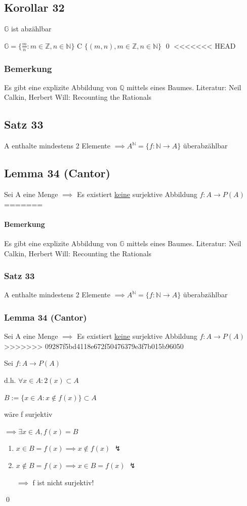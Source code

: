 \documentclass[fleqn]{scrbook}
\newcommand{\qq}[1]{\glqq #1\grqq}
\newcommand{\N}{\mathbb{N}}
\renewenvironment{proof}{{\bfseries Beweis }}{\qed}
\begin{document}
\subsection{Korollar 32}

$\mathbb{G}$ ist abzählbar

\begin{proof}
$\mathbb{G} = \{ \frac{m}{n}: m \in \mathbb{Z}, n \in \N\}$ \qq C $\{(m,n), m \in \mathbb{Z}, n \in \N\}$
\end{proof}
<<<<<<< HEAD
\subsubsection{Bemerkung} Es gibt eine explizite Abbildung von $\mathbb{Q}$ mittels eines Baumes. Literatur: Neil Calkin, Herbert Will: Recounting the Rationals
\subsection{Satz 33} A enthalte mindestens 2 Elemente $\implies A^\N = \{ f: \N \rightarrow A\}$ überabzählbar
\subsection{Lemma 34 (Cantor)} Sei A eine Menge $\implies$ Es existiert \underline{keine} surjektive Abbildung $f: A \rightarrow P(A)$
=======
\paragraph{Bemerkung} Es gibt eine explizite Abbildung von $\mathbb{G}$ mittels eines Baumes. Literatur: Neil Calkin, Herbert Will: Recounting the Rationals
\subsubsection{Satz 33} A enthalte mindestens 2 Elemente $\implies A^\N = \{ f: \N \rightarrow A\}$ überabzählbar
\subsubsection{Lemma 34 (Cantor)} Sei A eine Menge $\implies$ Es existiert \underline{keine} surjektive Abbildung $f: A \rightarrow P(A)$
>>>>>>> 09287f5bd4118e672f50476379e3f7b015b96050

\begin{proof}
	Sei $f: A \rightarrow P(A)$
	
	d.h. $\forall x \in A: 2(x) \subset A$
	
	$B:=\{ x \in A: x \notin f(x)\} \subset A$
	
	wäre f surjektiv
	
	$\implies \exists x \in A, f(x) = B$
	
	\begin{enumerate}[1. {Fall}:]
		\item $x \in B = f(x) \implies x \notin f(x)$ $\lightning$
		
		\item $x \notin B = f(x) \implies x \in B = f(x)$ $\lightning$
		
			$\implies$ f ist nicht surjektiv!
	\end{enumerate}
\end{proof}
\end{document}
